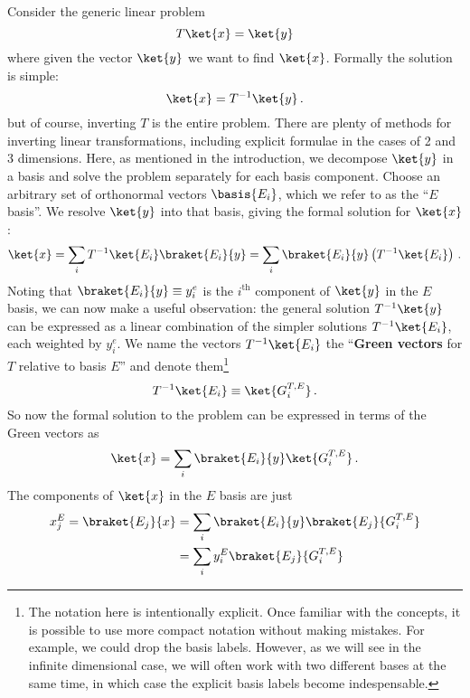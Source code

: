 
Consider the generic linear problem
\begin{equation}
  T \ket{x} = \ket{y}
\end{equation}
where given the vector $\ket{y}$ we want to find $\ket{x}$.
Formally the solution is simple:
\begin{equation}
  \ket{x} = T^{-1} \ket{y}
  \, .
\end{equation}
but of course, inverting $T$ is the entire problem.
There are plenty of methods for inverting linear transformations, including explicit formulae in the cases of 2 and 3 dimensions.
Here, as mentioned in the introduction, we decompose $\ket{y}$ in a basis and solve the problem separately for each basis component.
Choose an arbitrary set of orthonormal vectors $\basis{E_i}$, which we refer to as the ``$E$ basis''.
We resolve $\ket{y}$ into that basis, giving the formal solution for $\ket{x}$:
\begin{equation}
  \ket{x} = \sum_i T^{-1} \ket{E_i} \braket{E_i}{y}
  = \sum_i \braket{E_i}{y} \left( T^{-1} \ket{E_i} \right)
  \, .
\end{equation}
Noting that $\braket{E_i}{y} \equiv y_i^e$ is the $i^\text{th}$ component of $\ket{y}$ in the $E$ basis, we can now make a useful observation: the general solution $T^{-1}\ket{y}$ can be expressed as a linear combination of the simpler solutions $T^{-1}\ket{E_i}$, each weighted by $y_i^e$.
We name the vectors $T^{-1}\ket{E_i}$ the ``\textbf{Green vectors} for $T$ relative to basis $E$'' and denote them\footnote{The notation here is intentionally explicit.
Once familiar with the concepts, it is possible to use more compact notation without making mistakes. For example, we could drop the basis labels. However, as we will see in the infinite dimensional case, we will often work with two different bases at the same time, in which case the explicit basis labels become indespensable.}
\begin{equation}
  T^{-1} \ket{E_i} \equiv \ket{G^{T,E}_i}
  \, .
\end{equation}
So now the formal solution to the problem can be expressed in terms of the Green vectors as
\begin{equation}
  \ket{x} = \sum_i \braket{E_i}{y} \ket{G_i^{T,E}}
  \label{eq:green_vector_expansion}
  \, .
\end{equation}
The components of $\ket{x}$ in the $E$ basis are just
\begin{align}
  x_j^E = \braket{E_j}{x}
  & = \sum_i \braket{E_i}{y} \braket{E_j}{G_i^{T, E}} \nonumber \\
  & = \sum_i y_i^E \braket{E_j}{G_i^{T, E}}
\end{align}
